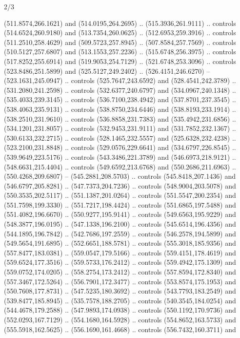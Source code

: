 \begin{flagdescription}{2/3}
\begin{scope}[xshift=0.5\flaglength,yshift=0.5\flagwidth,scale=\flagwidth/562]
\begin{scope}[y=1pt, x=1pt, yscale=-1,shift={(-421.88,-281.25)}]
  (511.8574,266.1621) and (514.0195,264.2695) .. (515.3936,261.9111) .. controls
  (514.6524,260.9180) and (513.7354,260.0625) .. (512.6953,259.3916) .. controls
  (511.2510,258.4629) and (509.5723,257.8945) .. (507.8584,257.7569) .. controls
  (510.5127,257.6807) and (513.1553,257.2236) .. (515.6748,256.3975) .. controls
  (517.8252,255.6914) and (519.9053,254.7129) .. (521.6748,253.3096) .. controls
  (523.8486,251.5899) and (525.5127,249.2402) .. (526.4151,246.6270) --
  (523.1631,245.0947) .. controls (525.7647,243.6592) and (528.4541,242.3789) ..
  (531.2080,241.2598) .. controls (532.6377,240.6797) and (534.0967,240.1348) ..
  (535.4033,239.3145) .. controls (536.7100,238.4942) and (537.8701,237.3545) ..
  (538.4063,235.9131) .. controls (538.8750,234.6446) and (538.8193,233.1914) ..
  (538.2510,231.9610) .. controls (536.8858,231.7383) and (535.4942,231.6856) ..
  (534.1201,231.8057) .. controls (532.9453,231.9111) and (531.7852,232.1367) ..
  (530.6133,232.2715) .. controls (528.1465,232.5557) and (525.6328,232.4238) ..
  (523.2100,231.8848) .. controls (529.0576,229.6641) and (534.6797,226.8545) ..
  (539.9649,223.5176) .. controls (543.3486,221.3789) and (546.6973,218.9121) ..
  (548.6631,215.4404) .. controls (549.6592,213.6768) and (550.2686,211.6963) ..
  (550.4268,209.6807) -- (545.2881,208.5703) .. controls (545.8418,207.1436) and
  (546.6797,205.8281) .. (547.7373,204.7236) .. controls (548.9004,203.5078) and
  (550.3535,202.5117) .. (551.1387,201.0264) .. controls (551.5547,200.2354) and
  (551.7598,199.3330) .. (551.7217,198.4424) .. controls (551.6865,197.5488) and
  (551.4082,196.6670) .. (550.9277,195.9141) .. controls (549.6563,195.9229) and
  (548.3877,196.0195) .. (547.1338,196.2100) .. controls (545.6514,196.4356) and
  (544.1895,196.7842) .. (542.7686,197.2559) .. controls (546.2578,194.5899) and
  (549.5654,191.6895) .. (552.6651,188.5781) .. controls (555.3018,185.9356) and
  (557.8477,183.0381) .. (559.0547,179.5166) .. controls (559.4151,178.4619) and
  (559.6524,177.3516) .. (559.5733,176.2412) .. controls (559.4942,175.1309) and
  (559.0752,174.0205) .. (558.2754,173.2412) .. controls (557.8594,172.8340) and
  (557.3467,172.5264) .. (556.7901,172.3477) .. controls (553.8574,175.1953) and
  (550.7608,177.8731) .. (547.5235,180.3692) .. controls (543.7793,183.2549) and
  (539.8477,185.8945) .. (535.7578,188.2705) .. controls (540.3545,184.0254) and
  (544.4678,179.2588) .. (547.9893,174.0938) .. controls (550.1192,170.9736) and
  (552.0293,167.7129) .. (554.1680,164.5928) .. controls (554.8652,163.5733) and
  (555.5918,162.5625) .. (556.1690,161.4668) .. controls (556.7432,160.3711) and

\end{scope}
\end{scope}
\end{flagdescription}
